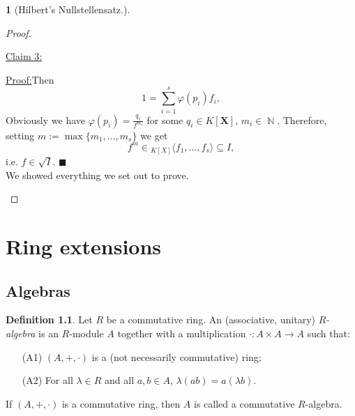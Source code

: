 \documentclass[12pt,a4paper]{report}
\theoremstyle{definition}
\newtheorem{defn}[theorem]{Definition}
\theoremstyle{num.custom-title}
\newtheorem{teo_custom-title}[theorem]{} %
\newenvironment{claim}[1]{\par\noindent\underline{Claim#1:}\space}{} %
\newenvironment{claimproof}[1]{\par\noindent\underline{Proof:}\space#1}{\leavevmode\unskip\penalty9999 \hbox{}\nobreak\hfill\quad\hbox{$\blacksquare$}} %
\DeclareMathOperator{\N}{\mathbb{N}}
\DeclareMathOperator{\sse}{\subseteq}
\newcommand{\X}{\mathbf{X}}
\renewcommand{\phi}{\varphi}
\begin{document}
\begin{teo_custom-title}[Hilbert's Nullstellensatz.]
\begin{proof}
\begin{enumerate}
\begin{claim}{ 3}
\begin{claimproof}
Then
\[
1 = \sum_{i=1}^s \phi(p_i)f_i,
\]
Obviously we have $\phi(p_i) = \frac{q_i}{f^{m_i}}$ for some $q_i \in K[\X]$, $m_i \in \N$. Therefore, setting $m := \max\{m_1,...,m_s\}$ we get
\[
f^m \in {}_{K[X]} \langle f_1, \ldots, f_s \rangle \sse I,
\]
i.e. $f \in \sqrt{I}$.
\end{claimproof}
\end{claim}\\
We showed everything we set out to prove.
\end{enumerate}
\end{proof}
\end{teo_custom-title}

\chapter{Ring extensions}

\section{Algebras}

\begin{defn}
Let $R$ be a commutative ring. An (associative, unitary) $R$\emph{-algebra} is an $R$-module $A$ together with a multiplication $\cdot : A \times A \to A$ such that:
\begin{itemize}
\item[(A1)] $(A,+,\cdot)$ is a (not necessarily commutative) ring;
\item[(A2)] For all $\lambda \in R$ and all $a,b \in A$, $\lambda (ab) = a (\lambda b)$.
\end{itemize}
If $(A,+,\cdot)$ is a commutative ring, then $A$ is called a commutative $R$-algebra.
\end{defn}
\end{document}
